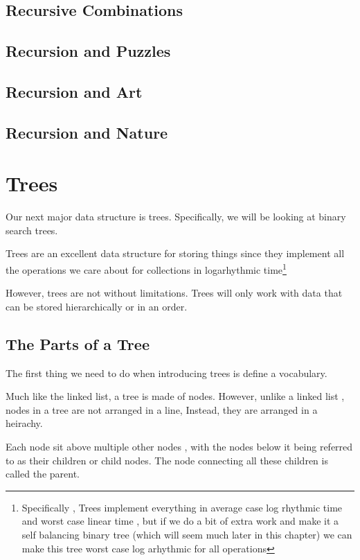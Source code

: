 \documentclass[10pt,a4paper]{book}
\begin{document}
\section{Recursive Combinations}



\section{Recursion and Puzzles}



\section{Recursion and Art}

\section{Recursion and Nature}


\chapter{Trees}


Our next major data structure is trees.  Specifically, we will be looking at binary search trees.

Trees are an excellent data structure for storing things since they implement all the operations we care about for collections in logarhythmic time\footnote{Specifically , Trees implement everything in average case log rhythmic time and worst case linear time , but if we do a bit of extra work and make it a self balancing binary tree (which will seem much later in this chapter) we can make this tree worst case log arhythmic for all operations}


However, trees are not without limitations.  Trees will only work with data that can be stored hierarchically or in an order.

\section{The Parts of a Tree}

The first thing we need to do when introducing trees is define a vocabulary.  

Much like the linked list, a tree is made of nodes.
However, unlike a linked list , nodes in a tree are not arranged in a line,
Instead, they are arranged in a heirachy.

Each node sit above multiple other nodes , with the nodes below it being referred to as their children or child nodes.  The node connecting all these children is called the parent.
\end{document}
